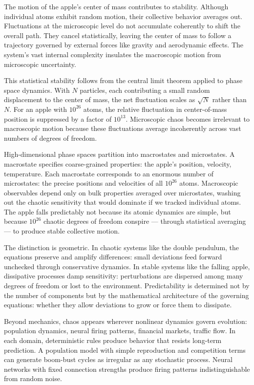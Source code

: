The motion of the apple's center of mass contributes to stability. Although individual atoms exhibit random motion, their collective behavior averages out. Fluctuations at the microscopic level do not accumulate coherently to shift the overall path. They cancel statistically, leaving the center of mass to follow a trajectory governed by external forces like gravity and aerodynamic effects. The system's vast internal complexity insulates the macroscopic motion from microscopic uncertainty.

This statistical stability follows from the central limit theorem applied to phase space dynamics. With $N$ particles, each contributing a small random displacement to the center of mass, the net fluctuation scales as $\sqrt{N}$ rather than $N$. For an apple with $10^{26}$ atoms, the relative fluctuation in center-of-mass position is suppressed by a factor of $10^{13}$. Microscopic chaos becomes irrelevant to macroscopic motion because these fluctuations average incoherently across vast numbers of degrees of freedom.

High-dimensional phase spaces partition into macrostates and microstates. A macrostate specifies coarse-grained properties: the apple's position, velocity, temperature. Each macrostate corresponds to an enormous number of microstates: the precise positions and velocities of all $10^{26}$ atoms. Macroscopic observables depend only on bulk properties averaged over microstates, washing out the chaotic sensitivity that would dominate if we tracked individual atoms. The apple falls predictably not because its atomic dynamics are simple, but because $10^{26}$ chaotic degrees of freedom conspire — through statistical averaging — to produce stable collective motion.

The distinction is geometric. In chaotic systems like the double pendulum, the equations preserve and amplify differences: small deviations feed forward unchecked through conservative dynamics. In stable systems like the falling apple, dissipative processes damp sensitivity: perturbations are dispersed among many degrees of freedom or lost to the environment. Predictability is determined not by the number of components but by the mathematical architecture of the governing equations: whether they allow deviations to grow or force them to dissipate.

Beyond mechanics, chaos appears wherever nonlinear dynamics govern evolution: population dynamics, neural firing patterns, financial markets, traffic flow. In each domain, deterministic rules produce behavior that resists long-term prediction. A population model with simple reproduction and competition terms can generate boom-bust cycles as irregular as any stochastic process. Neural networks with fixed connection strengths produce firing patterns indistinguishable from random noise.

